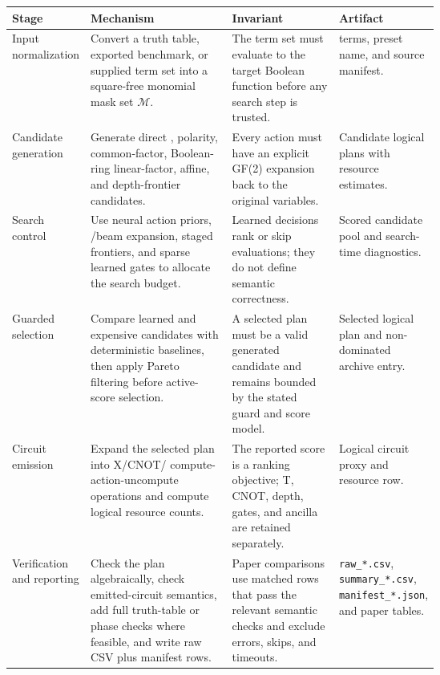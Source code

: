 \begin{tabularx}{\linewidth}{>{\raggedright\arraybackslash}p{0.17\linewidth}>{\raggedright\arraybackslash}X>{\raggedright\arraybackslash}p{0.25\linewidth}>{\raggedright\arraybackslash}p{0.20\linewidth}}
\toprule
Stage & Mechanism & Invariant & Artifact \\
\midrule
Input normalization & Convert a truth table, exported benchmark, or supplied term set into a square-free \anf{} monomial mask set $\mathcal{M}$. & The term set must evaluate to the target Boolean function before any search step is trusted. & \anf{} terms, preset name, and source manifest. \\
Candidate generation & Generate direct \anf{}, \fprm{} polarity, common-factor, Boolean-ring linear-factor, affine, and depth-frontier candidates. & Every action must have an explicit GF(2) expansion back to the original variables. & Candidate logical plans with resource estimates. \\
Search control & Use neural action priors, \mcts{}/beam expansion, staged frontiers, and sparse learned gates to allocate the search budget. & Learned decisions rank or skip evaluations; they do not define semantic correctness. & Scored candidate pool and search-time diagnostics. \\
Guarded selection & Compare learned and expensive candidates with deterministic baselines, then apply Pareto filtering before active-score selection. & A selected plan must be a valid generated candidate and remains bounded by the stated guard and score model. & Selected logical plan and non-dominated archive entry. \\
Circuit emission & Expand the selected plan into X/CNOT/\mct{} compute-action-uncompute operations and compute logical resource counts. & The reported score is a ranking objective; T, CNOT, depth, gates, and ancilla are retained separately. & Logical circuit proxy and resource row. \\
Verification and reporting & Check the plan algebraically, check emitted-circuit \anf{} semantics, add full truth-table or phase checks where feasible, and write raw CSV plus manifest rows. & Paper comparisons use matched rows that pass the relevant semantic checks and exclude errors, skips, and timeouts. & \texttt{raw\_*.csv}, \texttt{summary\_*.csv}, \texttt{manifest\_*.json}, and paper tables. \\
\bottomrule
\end{tabularx}
